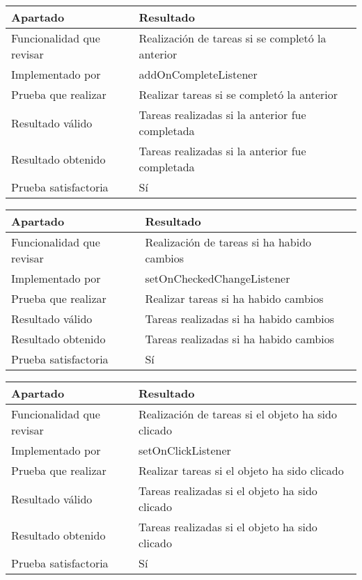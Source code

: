 \bigskip

\begin{center}
    \begin{tabulary}{0.8\textwidth}{L|L}
        \textbf{Apartado} & \textbf{Resultado} \\ \hline
        Funcionalidad que revisar & Realización de tareas si se completó la anterior \\
        Implementado por & addOnCompleteListener \\
        Prueba que realizar & Realizar tareas si se completó la anterior \\
        Resultado válido & Tareas realizadas si la anterior fue completada \\
        Resultado obtenido & Tareas realizadas si la anterior fue completada \\
        Prueba satisfactoria & Sí \\
    \end{tabulary}
\end{center}

\bigskip

\begin{center}
    \begin{tabulary}{0.8\textwidth}{L|L}
        \textbf{Apartado} & \textbf{Resultado} \\ \hline
        Funcionalidad que revisar & Realización de tareas si ha habido cambios \\
        Implementado por & setOnCheckedChangeListener \\
        Prueba que realizar & Realizar tareas si ha habido cambios \\
        Resultado válido & Tareas realizadas si ha habido cambios \\
        Resultado obtenido & Tareas realizadas si ha habido cambios \\
        Prueba satisfactoria & Sí \\
    \end{tabulary}
\end{center}

\bigskip

\begin{center}
    \begin{tabulary}{0.8\textwidth}{L|L}
        \textbf{Apartado} & \textbf{Resultado} \\ \hline
        Funcionalidad que revisar & Realización de tareas si el objeto ha sido clicado \\
        Implementado por & setOnClickListener \\
        Prueba que realizar & Realizar tareas si el objeto ha sido clicado \\
        Resultado válido & Tareas realizadas si el objeto ha sido clicado \\
        Resultado obtenido & Tareas realizadas si el objeto ha sido clicado \\
        Prueba satisfactoria & Sí \\
    \end{tabulary}
\end{center}

